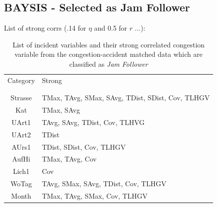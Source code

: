 \subsection{BAYSIS - Selected as Jam Follower}

List of strong corrs (.14 for $\eta$ and 0.5 for $r$ ...):

\noindent
\begin{table}[h!]
	\centering
	\begin{tabular}{c|l}  
		Category & Strong \\
		\\[-1em]
		\hline
		\\[-1em]
		Strasse & TMax, TAvg, SMax, SAvg, TDist, SDist, Cov, TLHGV \\ 
 		Kat & TMax, SAvg\\ 
 		UArt1 & TAvg, SAvg, TDist, Cov, TLHVG \\
 		UArt2 & TDist \\
 		AUrs1 & TDist, SDist, Cov, TLHGV \\
 		AufHi & TMax, TAvg, Cov \\
 		Lich1 & Cov \\
 		WoTag & TAvg, SMax, SAvg, TDist, Cov, TLHGV \\
 		Month & TMax, TAvg, SMax, Cov, TLHGV \\
	\end{tabular}
    \caption{List of incident variables and their strong correlated congestion variable from the congestion-accident matched data which are classified as \textit{Jam Follower}}
	\label{tbl:correlation_list_baysis_follower}
\end{table}

